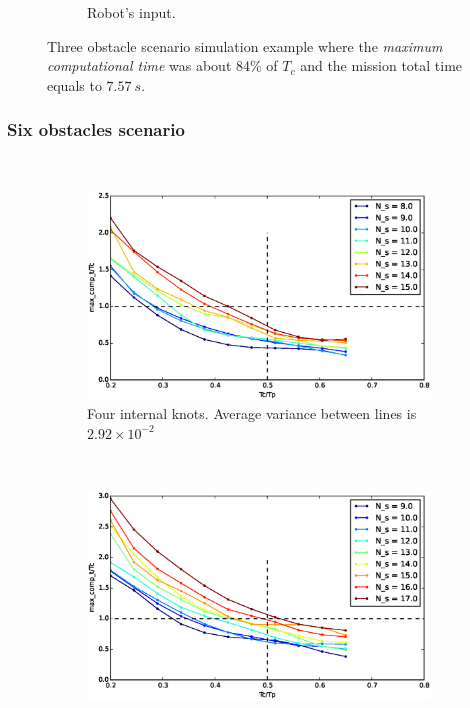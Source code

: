 \begin{figure}[!h]
\begin{subfigure}[b]{0.48\textwidth}
                \caption{Robot's input.}\label{fig:rinput}
        \end{subfigure}
        \caption{Three obstacle scenario simulation example where the \textit{maximum computational time} was about 84\% of $T_c$ and the mission total time equals to $7.57\ s$.}\label{fig:uni3}
\end{figure}

\subsubsection{Six obstacles scenario}

\begin{figure}
        \centering
        ~ %
        \begin{subfigure}[b]{0.48\textwidth}
                \includegraphics[width=\textwidth]{./img/realtime/Scenario_6__N_knots_4/mcttc-tctp.eps}
                \caption{Four internal knots.  Average variance between lines is $2.92\times 10^{-2}$}\label{fig:uni64}
        \end{subfigure}
        ~ %
        \begin{subfigure}[b]{0.48\textwidth}
                \includegraphics[width=\textwidth]{./img/realtime/Scenario_6__N_knots_5/mcttc-tctp.eps}

\end{subfigure}
\end{figure}

